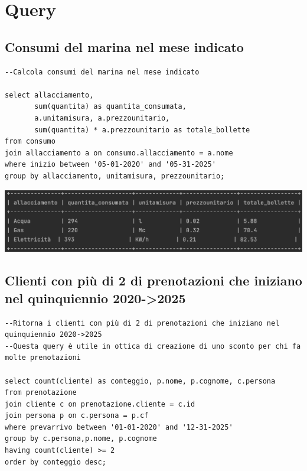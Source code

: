 


\section{Query}

\subsection{Consumi del marina nel mese indicato}
\begin{lstlisting}
--Calcola consumi del marina nel mese indicato

select allacciamento,
       sum(quantita) as quantita_consumata,
       a.unitamisura, a.prezzounitario,
       sum(quantita) * a.prezzounitario as totale_bollette
from consumo
join allacciamento a on consumo.allacciamento = a.nome
where inizio between '05-01-2020' and '05-31-2025'
group by allacciamento, unitamisura, prezzounitario;

\end{lstlisting}

\includegraphics[width=\linewidth]{img/result_consumi.png}

\subsection{Clienti con più di 2 di prenotazioni che iniziano nel quinquiennio 2020->2025}

\begin{lstlisting}
--Ritorna i clienti con più di 2 di prenotazioni che iniziano nel quinquiennio 2020->2025
--Questa query è utile in ottica di creazione di uno sconto per chi fa molte prenotazioni

select count(cliente) as conteggio, p.nome, p.cognome, c.persona
from prenotazione
join cliente c on prenotazione.cliente = c.id
join persona p on c.persona = p.cf
where prevarrivo between '01-01-2020' and '12-31-2025'
group by c.persona,p.nome, p.cognome
having count(cliente) >= 2
order by conteggio desc;
\end{lstlisting}


